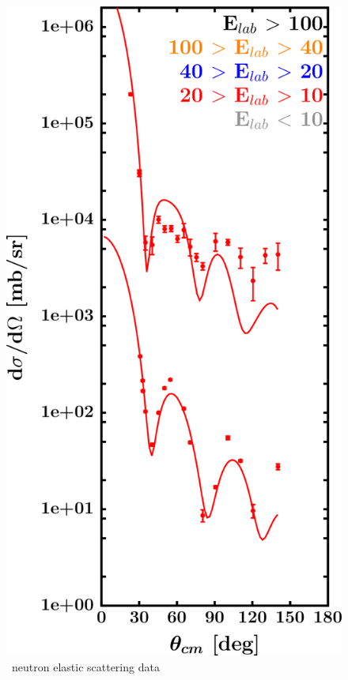 \begin{figure}[H]
\begin{minipage}{0.45\textwidth}
        \label{DOMFitData_sn112_proton_elastic}
    \end{minipage}\hfill
    \begin{minipage}{0.45\textwidth}
        \centering
        \includegraphics[width=1.0\textwidth]{figures/sn112_neutronElastic.png}
        \caption{\snTwelve\ neutron elastic scattering data}
        \label{DOMFitData_sn112_neutron_elastic}
    \end{minipage}
\end{figure}

